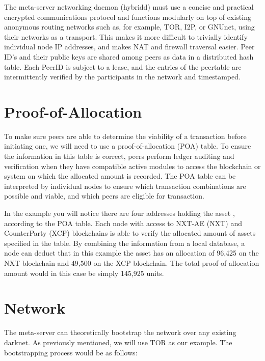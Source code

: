 \documentclass[a4paper]{article}
\begin{document}
The meta-server networking daemon (hybridd) must use a concise and practical encrypted communications protocol and functions modularly  on top of existing anonymous routing networks such as, for example, TOR\cite{tor}, I2P\cite{i2p}, or GNUnet\cite{gnunet}, using their networks as a transport. This makes it more difficult to trivially identify individual node IP addresses, and makes NAT and firewall traversal easier. Peer ID's and their public keys are shared among peers as data in a distributed hash table\cite{dht}. Each PeerID is subject to a lease, and the entries of the peertable are intermittently verified by the participants in the network and timestamped.

\section{Proof-of-Allocation}

To make sure peers are able to determine the viability of a transaction before initiating one, we will need to use a proof-of-allocation (POA) table. To ensure the information in this table is correct, peers perform ledger auditing and verification when they have compatible active modules to access the blockchain or system on which the allocated amount is recorded. The POA table can be interpreted by individual nodes to ensure which transaction combinations are possible and viable, and which peers are eligible for transaction.

In the example you will notice there are four addresses holding the asset \stormwind, according to the POA table. Each node with access to NXT-AE (NXT) and CounterParty (XCP) blockchains is able to verify the allocated amount of assets specified in the table. By combining the information from a local database, a node can deduct that in this example the asset \stormwind has an allocation of 96,425 on the NXT blockchain and 49,500 on the XCP blockchain. The total proof-of-allocation amount would in this case be simply 145,925 units.

\section{Network}

The meta-server can theoretically bootstrap the network over any existing darknet. As previously mentioned, we will use TOR as our example. The bootstrapping process would be as follows:
\end{document}
